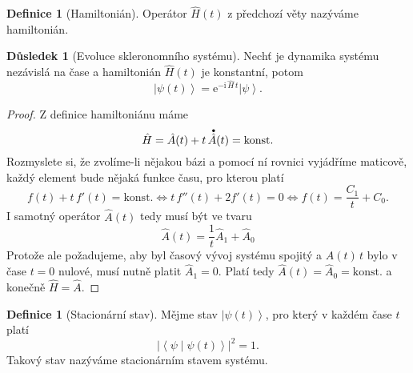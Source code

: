 \documentclass[10pt,a4paper]{article}
\theoremstyle{definition}
\newtheorem{definition}[theorem]{Definice}
\newtheorem{corollary}[theorem]{Důsledek}
\newcommand{\const}[1]{\mathrm{#1}}
\newcommand{\abs}[1]{\left| #1 \right|}
\newcommand{\ket}[1]{\left| #1 \right>}
\newcommand{\braket}[2]{\left< #1 \middle| #2 \right>}
\newcommand{\e}[1]{\const{e}^{#1}}
\renewcommand{\i}{\const{i}}
\newcommand{\bigdot}[1]{\accentset{\bullet}{#1}}
\def\konst{\mathrm{konst.}}
\begin{document}
\begin{definition}[Hamiltonián]
    Operátor $\hat H(t)$ z předchozí věty nazýváme hamiltonián.
\end{definition}

\begin{corollary}[Evoluce skleronomního systému]
    \label{evoluce-skleronomniho-systemu}
    Nechť je dynamika systému nezávislá na čase a hamiltonián $\hat H(t)$ je konstantní, potom
    \begin{equation*}
        \ket{\psi(t)} = \e{-\i \, \hat{H} \, t} \ket{\psi}.
    \end{equation*}
\end{corollary}
\begin{proof}
    Z definice hamiltoniánu máme
    \begin{equation*}
        \hat H = \hat A(t) + t \, \bigdot{\hat A}(t) = \konst
    \end{equation*}
    Rozmyslete si, že zvolíme-li nějakou bázi a pomocí ní rovnici vyjádříme maticově, každý element bude nějaká funkce času, pro kterou platí
    \begin{equation*}
        f(t) + t \, f'(t) = \konst
        \iff
        t \, f''(t) + 2 f'(t) = 0
        \iff
        f(t) = \frac{C_1}{t} + C_0.
    \end{equation*}
    I samotný operátor $\hat A(t)$ tedy musí být ve tvaru
    \begin{equation*}
        \hat A(t) = \frac{1}{t} \hat A_1 + \hat A_0
    \end{equation*}
    Protože ale požadujeme, aby byl časový vývoj systému spojitý a $\hat A(t) \, t$ bylo v čase $t=0$ nulové, musí nutně platit $\hat A_1 = 0$. Platí tedy $\hat A(t) = \hat A_0 = \konst$ a konečně $\hat H = \hat A$.
\end{proof}

\begin{definition}[Stacionární stav]
    Mějme stav $\ket{\psi(t)}$, pro který v každém čase $t$ platí
    \begin{equation*}
        \abs{\braket{\psi}{\psi(t)}}^2 = 1.
    \end{equation*}
    Takový stav nazýváme stacionárním stavem systému.
\end{definition}
\end{document}
